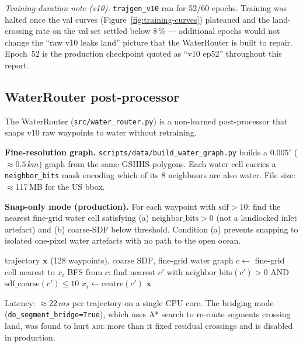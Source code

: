 \documentclass[11pt,a4paper]{article}
\newcommand{\ade}{\textsc{ade}}
\begin{document}
\noindent\textit{Training-duration note (v10).}
\texttt{trajgen\_v10} ran for 52/60 epochs.  Training was halted once the
val curves (Figure~\ref{fig:training-curves}) plateaued and the
land-crossing rate on the val set settled below 8\,\% --- additional
epochs would not change the ``raw v10 leaks land'' picture that the
WaterRouter is built to repair.  Epoch~52 is the production checkpoint
quoted as ``v10 ep52'' throughout this report.

\subsection{WaterRouter post-processor}
\label{sec:water-router}

The WaterRouter (\texttt{src/water\_router.py}) is a non-learned post-processor
that snaps v10 raw waypoints to water without retraining.

\textbf{Fine-resolution graph.}
\texttt{scripts/data/build\_water\_graph.py} builds a $0.005^\circ$ ($\approx0.5\,km$)
graph from the same GSHHS polygons.
Each water cell carries a \texttt{neighbor\_bits} mask encoding which of its
8 neighbours are also water.
File size: $\approx$117\,MB for the US bbox.

\textbf{Snap-only mode (production).}
For each waypoint with $\text{sdf} > 10$:
find the nearest fine-grid water cell satisfying (a) $\text{neighbor\_bits} > 0$
(not a landlocked inlet artefact) and (b) coarse-SDF below threshold.
Condition (a) prevents snapping to isolated one-pixel water artefacts with no
path to the open ocean.

\begin{algorithm}[ht]
\caption{WaterRouter Snap-Only}
\label{alg:snap}
\begin{algorithmic}[1]
\REQUIRE trajectory $\mathbf{x}$ (128 waypoints), coarse SDF, fine-grid water graph
    \STATE $c \gets$ fine-grid cell nearest to $x_i$
    \STATE BFS from $c$: find nearest $c'$ with $\text{neighbor\_bits}(c') > 0$
            AND $\text{sdf\_coarse}(c') \le 10$
    \STATE $x_i \gets \text{centre}(c')$
  \ENDIF
\ENDFOR
\STATE \RETURN $\mathbf{x}$
\end{algorithmic}
\end{algorithm}

Latency: $\approx22\,ms$ per trajectory on a single CPU core.
The bridging mode (\texttt{do\_segment\_bridge=True}), which uses A* search to
re-route segments crossing land, was found to hurt \ade{} more than it fixed
residual crossings and is disabled in production.
\end{document}

